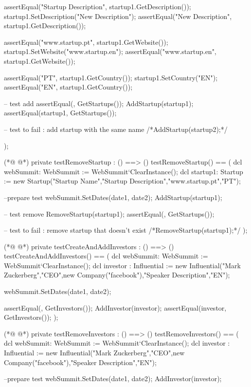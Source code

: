 \begin{vdmpp}[breaklines=true]
  assertEqual("Startup Description", startup1.GetDescription());
  startup1.SetDescription("New Description");
  assertEqual("New Description", startup1.GetDescription());
  
  assertEqual("www.startup.pt", startup1.GetWebsite());
  startup1.SetWebsite("www.startup.en");
  assertEqual("www.startup.en", startup1.GetWebsite());
  
  assertEqual("PT", startup1.GetCountry());
  startup1.SetCountry("EN");
  assertEqual("EN", startup1.GetCountry());
  
  -- test add
  assertEqual({}, GetStartups());
  AddStartup(startup1);
  assertEqual({startup1}, GetStartups());
  
  -- test to fail : add startup with the same name
  /*AddStartup(startup2);*/
  
 );
 
(*@
\label{testRemoveStartup:424}
@*)
 private testRemoveStartup : () ==> ()
 testRemoveStartup() == (
  dcl webSummit: WebSummit := WebSummit`ClearInstance();
  dcl startup1: Startup := new Startup("Startup Name","Startup Description","www.startup.pt","PT");
  
  --prepare test
  webSummit.SetDates(date1, date2);
  AddStartup(startup1);
  
  -- test remove
  RemoveStartup(startup1);
  assertEqual({}, GetStartups());
  
  -- test to fail : remove startup that doesn't exist
  /*RemoveStartup(startup1);*/
 );
 
(*@
\label{testCreateAndAddInvestors:441}
@*)
 private testCreateAndAddInvestors : () ==> ()
 testCreateAndAddInvestors() == (
  dcl webSummit: WebSummit := WebSummit`ClearInstance();
  dcl investor : Influential := new Influential("Mark Zuckerberg","CEO",new Company("facebook"),"Speaker Description","EN");
  
  webSummit.SetDates(date1, date2);
  
  assertEqual({}, GetInvestors());
  AddInvestor(investor);
  assertEqual({investor}, GetInvestors());
 );
 
(*@
\label{testRemoveInvestors:453}
@*)
 private testRemoveInvestors : () ==> ()
 testRemoveInvestors() == (
  dcl webSummit: WebSummit := WebSummit`ClearInstance();
  dcl investor : Influential := new Influential("Mark Zuckerberg","CEO",new Company("facebook"),"Speaker Description","EN");
  
  --prepare test
  webSummit.SetDates(date1, date2);
  AddInvestor(investor);
 

\end{vdmpp}

